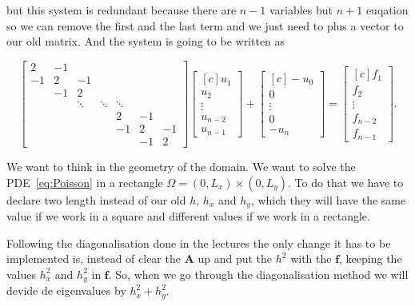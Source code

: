 \documentclass[fontsize=11pt,paper=a4,titlepage]{report}
\begin{document}
but this system is redundant because there are $n - 1$ variables but $n + 1$ 
euqation so we can remove the first and the last term and we just need to plus a
vector to our old matrix. And the system is going to be written as

\begin{displaymath}
\begin{bmatrix}
	2 & -1 &  &  &  &  &  \\
	-1 & 2 & -1 &  &  &  &  \\
	 & -1 & 2 &  &  &  &  \\
	 &  & \ddots & \ddots & \ddots &  & \\
	 &  &  &  & 2 & -1 &  \\
	 &  &  &  & -1 & 2 & -1 \\
	 &  &  &  &  & -1 & 2
\end{bmatrix}
\begin{bmatrix*}[c]
	u_1 \\
	u_2 \\
	\vdots \\
	u_{n - 2} \\
	u_{n - 1}
\end{bmatrix*}
+ \begin{bmatrix*}[c]
	- u_0 \\
	0 \\
	\vdots \\
	0 \\
	- u_n
\end{bmatrix*}
=
\begin{bmatrix*}[c]
	f_1 \\
	f_2 \\
	\vdots \\
	f_{n - 2} \\
	f_{n - 1}
\end{bmatrix*}.
\end{displaymath}




We want to think in the geometry of the domain. We want to solve the
PDE~\ref{eq:Poisson} in a rectangle $\Omega = (0, L_x) \times (0, L_y)$. To do
that we have to declare two length instead of our old $h$, $h_x$ and $h_y$,
which they will have the same value if we work in a square and different values
if we work in a rectangle.

Following the diagonalisation done in the lectures the only change it has to be
implemented is, instead of clear the $\mathbf{A}$ up and put the $h^2$ with the 
$\mathbf{f}$, 
keeping the values $h_x^2$ and $h_y^2$ in $\mathbf{f}$. So, when we go through 
the diagonalisation method we will devide de eigenvalues by $h_x^2 + h_y^2$.

\end{document}
